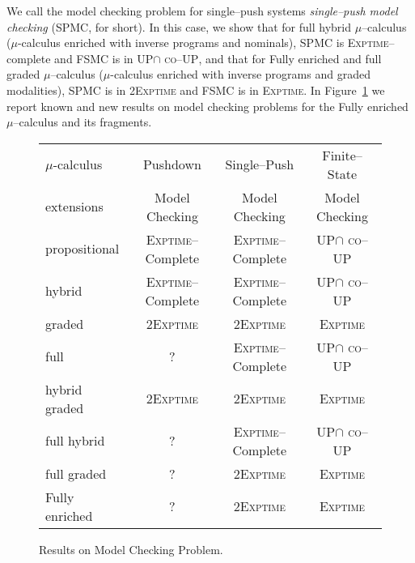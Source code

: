 \documentclass{LMCS}
\theoremstyle{plain}
\def \coUP          {\textsc{co--UP}\xspace}
\def \EXPTIME       {\textsc{Exptime}\xspace}
\def \FSMC          {\textsc{FSMC}\xspace}
\def \SPMC          {\textsc{SPMC}\xspace}
\def \TWOEXPTIME    {\textsc{2Exptime}\xspace}
\def \UP            {{\sc UP}}
\def \UP            {\textsc{UP}\xspace}
\begin{document}
We call the model checking problem for single--push systems \emph{single--push
model checking} (\SPMC, for short). In this case, we show that for full hybrid
$\mu$--calculus ($\mu$-calculus enriched with inverse programs and nominals),
\SPMC is \EXPTIME--complete and \FSMC is in \UP $\cap$ \coUP, and that for
Fully enriched and full graded $\mu$--calculus ($\mu$-calculus enriched with
inverse programs and graded modalities), \SPMC is in \TWOEXPTIME and \FSMC is
in \EXPTIME. In Figure~\ref{tab:ModelChecking} we report known and new results
on model checking problems for the Fully enriched $\mu$--calculus and its
fragments.

\begin{figure}[t]
    {\small
    \begin{tabular}{|l|c|c|c|}
        \hline
        $\mu$-calculus & Pushdown                        & Single--Push         & Finite--State                 \\
        extensions     & Model Checking                  & Model Checking       & Model Checking                \\
        \hline
        propositional  & \EXPTIME--Complete \cite{Wal96} & \EXPTIME--Complete   & \UP $\cap$ \coUP \cite{Wil01} \\
        hybrid         & \EXPTIME--Complete              & \EXPTIME--Complete   & \UP $\cap$ \coUP              \\
        graded         & \TWOEXPTIME                     & \TWOEXPTIME          & \EXPTIME                      \\
        full           & ?                               & \EXPTIME--Complete   & \UP $\cap$ \coUP              \\
        hybrid graded  & \TWOEXPTIME                     & \TWOEXPTIME          & \EXPTIME                      \\
        full hybrid    & ?                               & \EXPTIME--Complete   & \UP $\cap$ \coUP              \\
        full graded    & ?                               & \TWOEXPTIME          & \EXPTIME                      \\
        Fully enriched & ?                               & \TWOEXPTIME          & \EXPTIME                      \\
        \hline
    \end{tabular}
    \caption{Results on Model Checking Problem.}
    }
    \label{tab:ModelChecking}
\end{figure}
\end{document}
